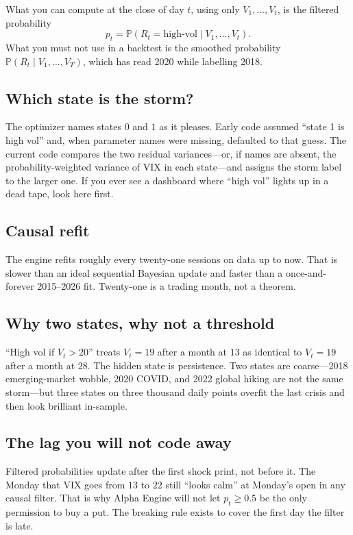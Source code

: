 \documentclass[11pt,a4paper]{article}
\begin{document}
What you can compute at the close of day $t$, using only $V_1,\ldots,V_t$, is the filtered probability
\begin{equation}
  p_t=\mathbb{P}(R_t=\text{high-vol}\mid V_1,\ldots,V_t).
\end{equation}
What you must not use in a backtest is the smoothed probability $\mathbb{P}(R_t\mid V_1,\ldots,V_T)$, which has read 2020 while labelling 2018.

\subsection{Which state is the storm?}

The optimizer names states $0$ and $1$ as it pleases. Early code assumed ``state 1 is high vol'' and, when parameter names were missing, defaulted to that guess. The current code compares the two residual variances---or, if names are absent, the probability-weighted variance of VIX in each state---and assigns the storm label to the larger one. If you ever see a dashboard where ``high vol'' lights up in a dead tape, look here first.

\subsection{Causal refit}

The engine refits roughly every twenty-one sessions on data up to now. That is slower than an ideal sequential Bayesian update and faster than a once-and-forever 2015--2026 fit. Twenty-one is a trading month, not a theorem.

\subsection{Why two states, why not a threshold}

``High vol if $V_t>20$'' treats $V_t=19$ after a month at $13$ as identical to $V_t=19$ after a month at $28$. The hidden state is persistence. Two states are coarse---2018 emerging-market wobble, 2020 COVID, and 2022 global hiking are not the same storm---but three states on three thousand daily points overfit the last crisis and then look brilliant in-sample.

\subsection{The lag you will not code away}

Filtered probabilities update after the first shock print, not before it. The Monday that VIX goes from $13$ to $22$ still ``looks calm'' at Monday's open in any causal filter. That is why Alpha Engine will not let $p_t\ge 0.5$ be the only permission to buy a put. The breaking rule exists to cover the first day the filter is late.
\end{document}
